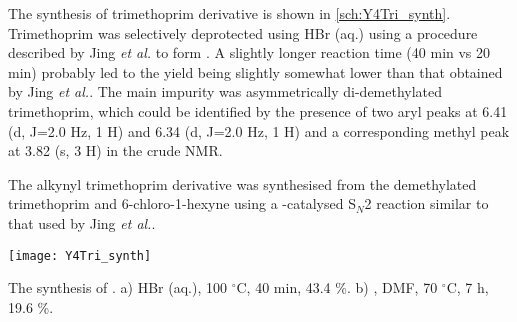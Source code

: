 The synthesis of trimethoprim derivative  is shown in \ref{sch:Y4Tri_synth}. Trimethoprim was selectively deprotected using HBr (aq.) using a procedure described by Jing \textit{et al.}\cite{Jing2013} to form . A slightly longer reaction time (40 min vs 20 min) probably led to the yield being slightly somewhat lower than that obtained by Jing \textit{et al.}. 
The main impurity was asymmetrically di-demethylated trimethoprim, which could be identified by the presence of two aryl peaks at 6.41 (d, J=2.0 Hz, 1 H) and 6.34 (d, J=2.0 Hz, 1 H) and a corresponding methyl peak at 3.82 (s, 3 H) in the crude NMR.

The alkynyl trimethoprim derivative  was synthesised from the demethylated trimethoprim  and 6-chloro-1-hexyne  using a -catalysed S$_N$2 reaction similar to that used by Jing \textit{et al.}.

\begin{scheme}[H]
	\begin{center}
		\texttt{[image: Y4Tri\_synth]}
		\caption{The synthesis of .
		a) HBr (aq.), 100 $^{\circ}$C, 40 min, 43.4 \%. 
		b) , DMF, 70 $^{\circ}$C, 7 h, 19.6 \%.
		\label{sch:Y4Tri_synth}}
	\end{center}
\end{scheme}

